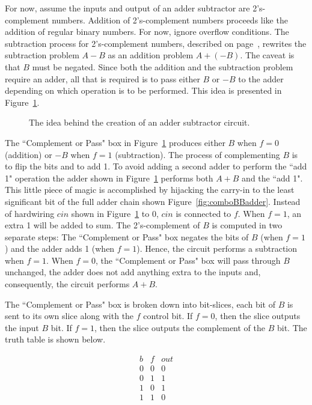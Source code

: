 For now, assume the inputs and output of an adder subtractor are
2's-complement numbers.  Addition of 2's-complement numbers proceeds 
like the addition of regular binary numbers.  For now, 
ignore overflow conditions.  The subtraction process
for 2's-complement numbers, described on page~\pageref{page:2sub}, rewrites
the subtraction problem $A-B$ as an addition problem $A+(-B)$.  The caveat
is that $B$ must be negated.  Since both the addition and the subtraction 
problem
require an adder, all that is required is to pass either $B$ or $-B$ to the
adder depending on which operation is to be performed.  This idea is
presented in Figure~\ref{fig:comboBBAddSub}.

\begin{figure}[ht]
\caption{The idea behind the creation of an adder subtractor circuit.}
\label{fig:comboBBAddSub}
\end{figure}

The ``Complement or Pass" box in Figure~\ref{fig:comboBBAddSub} produces 
either $B$ when $f=0$ (addition) or $-B$ when $f=1$ (subtraction).
The process of complementing $B$ is to flip the bits and to add 1.
To avoid adding a second adder to perform the ``add 1" 
operation the adder shown in Figure~\ref{fig:comboBBAddSub} performs 
both $A+B$ and the ``add 1".  This little piece of magic is 
accomplished by hijacking the carry-in to the least significant 
bit of the full adder chain shown Figure~\ref{fig:comboBBadder}.  Instead
of hardwiring $cin$ shown in Figure~\ref{fig:comboBBAddSub} to 0, $cin$ is 
connected to $f$.  
When $f=1$, an extra 1 will be added to sum. The 2's-complement of
$B$ is computed in two separate steps: The ``Complement or Pass" box 
negates the bits of $B$ (when $f=1$) and the adder adds 1
(when $f=1$). Hence, the circuit performs a subtraction when $f=1$.
When $f=0$, the ``Complement or Pass" box will pass through $B$
unchanged, the adder does not add anything extra to the inputs and,
consequently, the circuit performs $A+B$.

The ``Complement or Pass" box is broken down into bit-slices, each
bit of $B$ is sent to its own slice along with the $f$ control
bit.  If $f=0$, then the slice outputs the input $B$ bit.  If $f=1$, 
then the slice outputs the complement of the $B$ bit.
The truth table is shown below.

$$\begin{array}{c|c||c}
b & f & out \\ \hline
0 & 0 & 0 \\ \hline
0 & 1 & 1 \\ \hline
1 & 0 & 1 \\ \hline
1 & 1 & 0 \\
\end{array}$$

